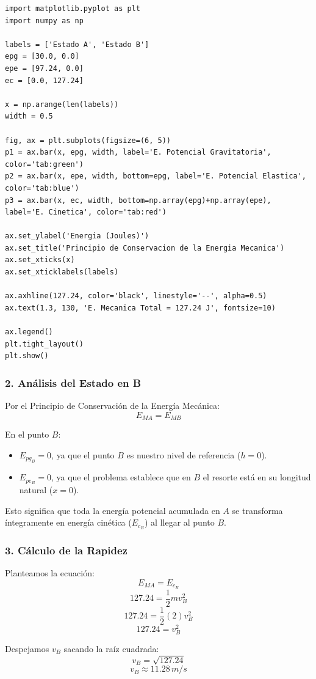 \documentclass[12pt, a4paper]{article}
\begin{document}
\begin{lstlisting}
import matplotlib.pyplot as plt
import numpy as np

labels = ['Estado A', 'Estado B']
epg = [30.0, 0.0]
epe = [97.24, 0.0]
ec = [0.0, 127.24]

x = np.arange(len(labels))
width = 0.5

fig, ax = plt.subplots(figsize=(6, 5))
p1 = ax.bar(x, epg, width, label='E. Potencial Gravitatoria', color='tab:green')
p2 = ax.bar(x, epe, width, bottom=epg, label='E. Potencial Elastica', color='tab:blue')
p3 = ax.bar(x, ec, width, bottom=np.array(epg)+np.array(epe), label='E. Cinetica', color='tab:red')

ax.set_ylabel('Energia (Joules)')
ax.set_title('Principio de Conservacion de la Energia Mecanica')
ax.set_xticks(x)
ax.set_xticklabels(labels)

ax.axhline(127.24, color='black', linestyle='--', alpha=0.5)
ax.text(1.3, 130, 'E. Mecanica Total = 127.24 J', fontsize=10)

ax.legend()
plt.tight_layout()
plt.show()
\end{lstlisting}

\subsubsection*{2. Análisis del Estado en B}
Por el Principio de Conservación de la Energía Mecánica:
$$ E_{MA} = E_{MB} $$

En el punto $B$:
\begin{itemize}
    \item $E_{pg_B} = 0$, ya que el punto $B$ es nuestro nivel de referencia ($h = 0$).
    \item $E_{pe_B} = 0$, ya que el problema establece que en $B$ el resorte está en su longitud natural ($x = 0$).
\end{itemize}
Esto significa que toda la energía potencial acumulada en $A$ se transforma íntegramente en energía cinética ($E_{c_B}$) al llegar al punto $B$.

\subsubsection*{3. Cálculo de la Rapidez}
Planteamos la ecuación:
$$ E_{MA} = E_{c_B} $$
$$ 127.24 = \frac{1}{2} m v_B^2 $$
$$ 127.24 = \frac{1}{2} (2) v_B^2 $$
$$ 127.24 = v_B^2 $$

Despejamos $v_B$ sacando la raíz cuadrada:
$$ v_B = \sqrt{127.24} $$
$$ v_B \approx 11.28 \, \si{m/s} $$
\end{document}
